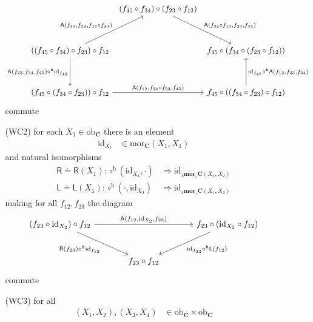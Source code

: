 \begin{enumerate}
\begin{enumerate}
\[\begin{tikzcd}[row sep=3.5em,column sep=0.4em]
  &
  (f_{45} \circ f_{34})
  \circ
  (f_{23} \circ f_{12})
  \arrow{dr}{\mathsf{A}(f_{23} \circ f_{12},f_{34},f_{45})}
  &
  \\
  \left(
    (f_{45} \circ f_{34})
    \circ
    f_{23}
  \right)
  \circ
  f_{12}
  \arrow{ur}{\mathsf{A}(f_{12},f_{23},f_{45} \circ f_{34})}
  \arrow[swap]{d}{\mathsf{A}(f_{23},f_{34},f_{45}) \circ^{\textrm{h}} \mathrm{id}_{f_{12}}}
  &
  &
  f_{45}
  \circ
  \left(
    f_{34}
    \circ
    (f_{23} \circ f_{12})
  \right)
  \\
  \left(
    f_{45}
    \circ
    (f_{34} \circ f_{23})
  \right)
  \circ
  f_{12}
  \arrow{rr}{\mathsf{A}(f_{12},f_{34} \circ f_{23},f_{45})}
  &
  &
  f_{45}
  \circ
  \left(
    (f_{34} \circ f_{23})
    \circ
    f_{12}
  \right)
  \arrow[swap]{u}{\mathrm{id}_{f_{45}} \circ^{\textrm{h}} \mathsf{A}(f_{12},f_{23},f_{34})}
\end{tikzcd}
\]
commute
\item[(WC2)]
for each $X_{1} \in \mathrm{ob}_{\mathbf{C}}$ there is an element
\begin{align*}
  \mathrm{id}_{X_{1}}
  &\in
  \mathrm{mor}_{\mathbf{C}}(X_{1},X_{1})
\end{align*}
and natural isomorphisms
\begin{align*}
  \mathsf{R}
  \doteq
  \mathsf{R}(X_{1})
  \colon
  \circ^{\textrm{h}}(\mathrm{id}_{X_{1}},\cdot)
  &\Rightarrow
  \mathrm{id}_{{}_{1}\mathbf{mor}_{{}_{2}}\mathbf{C}(X_{1},X_{2})}
  \\
  \mathsf{L}
  \doteq
  \mathsf{L}(X_{1})
  \colon
  \circ^{\textrm{h}}(\cdot,\mathrm{id}_{X_{2}})
  &\Rightarrow
  \mathrm{id}_{{}_{1}\mathbf{mor}_{{}_{2}}\mathbf{C}(X_{1},X_{2})}
\end{align*}
making for all $f_{12},f_{23}$ the diagram
\[
\begin{tikzcd}[sep=large]
  \left(
    f_{23}
    \circ
    \mathrm{id}_{X_{2}}
  \right)
  \circ
  f_{12}
  \arrow{rr}{\mathsf{A}(f_{12},\mathrm{id}_{X_{2}},f_{23})}
  \arrow[swap]{dr}{\mathsf{R}(f_{23}) \circ^{\textrm{h}} \mathrm{id}_{f_{12}}}
  &
  &
  f_{23}
  \circ
  \left(
    \mathrm{id}_{X_{2}}
    \circ
    f_{12}
  \right)
  \arrow{dl}{\mathrm{id}_{f_{23}} \circ^{\textrm{h}} \mathsf{L}(f_{12})}
  \\
  &
  f_{23}
  \circ
  f_{12}
  &
\end{tikzcd}
\]
commute
\item[(WC3)]
for all
\begin{align*}
  (X_{1},X_{2}),(X_{3},X_{4})
  &\in
  \mathrm{ob}_{\mathbf{C}}
  \times
  \mathrm{ob}_{\mathbf{C}}

\end{align*}
\end{enumerate}
\end{enumerate}
